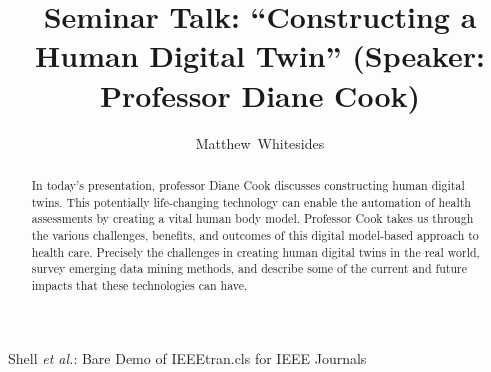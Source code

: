 \documentclass[journal,onecolumn]{IEEEtran}
\begin{document}
%
\title{Seminar Talk: ``Constructing a Human Digital Twin'' (Speaker: Professor Diane Cook)}

%
%
%
\author{Matthew~Whitesides}%

%
{Shell \MakeLowercase{\textit{et al.}}: Bare Demo of IEEEtran.cls for IEEE Journals}

\maketitle

\begin{abstract}
  In today's presentation, professor Diane Cook discusses constructing human digital twins. This potentially life-changing technology can enable the automation of health assessments by creating a vital human body model. Professor Cook takes us through the various challenges, benefits, and outcomes of this digital model-based approach to health care. Precisely the challenges in creating human digital twins in the real world, survey emerging data mining methods, and describe some of the current and future impacts that these technologies can have.
\end{abstract}


\IEEEpeerreviewmaketitle
\end{document}
